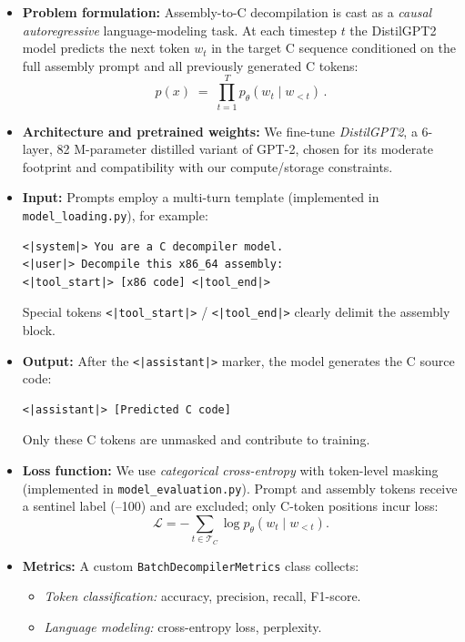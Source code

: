 \documentclass[../main.tex]{subfiles}
\begin{document}
\begin{itemize}
  \item \textbf{Problem formulation:}  
    Assembly-to-C decompilation is cast as a \emph{causal autoregressive} language-modeling task. At each timestep \(t\) the DistilGPT2 model predicts the next token \(w_t\) in the target C sequence conditioned on the full assembly prompt and all previously generated C tokens:
    \[
      p(x) \;=\;\prod_{t=1}^{T} p_\theta(w_t \mid w_{<t})\,.
    \]

  \item \textbf{Architecture and pretrained weights:}  
    We fine-tune \emph{DistilGPT2}, a 6-layer, 82 M-parameter distilled variant of GPT-2, chosen for its moderate footprint and compatibility with our compute/storage constraints.

  \item \textbf{Input:}  
    Prompts employ a multi-turn template (implemented in \texttt{model\_loading.py}), for example:
    \begin{verbatim}
<|system|> You are a C decompiler model.
<|user|> Decompile this x86_64 assembly:
<|tool_start|> [x86 code] <|tool_end|>
    \end{verbatim}
    Special tokens \texttt{<|tool\_start|>} / \texttt{<|tool\_end|>} clearly delimit the assembly block.

  \item \textbf{Output:}  
    After the \texttt{<|assistant|>} marker, the model generates the C source code:
    \begin{verbatim}
<|assistant|> [Predicted C code]
    \end{verbatim}
    Only these C tokens are unmasked and contribute to training.

  \item \textbf{Loss function:}  
    We use \emph{categorical cross-entropy} with token-level masking (implemented in \texttt{model\_evaluation.py}). Prompt and assembly tokens receive a sentinel label (–100) and are excluded; only C-token positions incur loss:
    \[
      \mathcal{L} = -\!\!\sum_{t \in \mathcal{T}_C}\log p_\theta(w_t \mid w_{<t}).
    \]

  \item \textbf{Metrics:}  
    A custom \texttt{BatchDecompilerMetrics} class collects:
    \begin{itemize}
      \item \emph{Token classification:} accuracy, precision, recall, F1-score.
      \item \emph{Language modeling:} cross-entropy loss, perplexity.
    \end{itemize}
\end{itemize}
\end{document}
